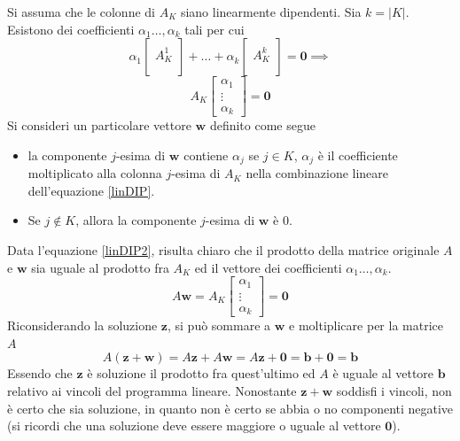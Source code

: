 \documentclass[10pt, letterpaper]{report}
\begin{document}
Si assuma  che le colonne di $A_K$ siano linearmente dipendenti. Sia $k=|K|$. Esistono dei coefficienti $\alpha_1\dots, \alpha_k$ tali per cui 
\begin{equation}\label{linDIP}
    \alpha_1\begin{bmatrix}
        \\A^1_K\\ \\
    \end{bmatrix}+\dots + \alpha_k\begin{bmatrix}
        \\A^k_K\\ \\
    \end{bmatrix}=\mathbf 0\implies 
\end{equation}\begin{equation}\label{linDIP2}
    A_K\begin{bmatrix}
        \alpha_1\\\vdots\\\alpha_k 
    \end{bmatrix}=\mathbf 0
\end{equation}
Si consideri un particolare vettore $\mathbf w$ definito come segue\begin{itemize}
    \item la componente $j$-esima di $\mathbf w$ contiene $\alpha_j$ se $j\in K $, $\alpha_j$ è il coefficiente moltiplicato alla colonna $j$-esima di $A_K$ nella combinazione lineare dell'equazione  \ref{linDIP}.
    \item Se $j\notin K$, allora la componente $j$-esima di $\mathbf w$ è 0.
\end{itemize}
Data l'equazione \ref{linDIP2}, risulta chiaro che il prodotto della matrice originale $A$ e $\mathbf w$ sia uguale al prodotto fra $A_K$ ed il vettore dei coefficienti $\alpha_1\dots,\alpha_k$. 
\begin{equation}\label{linDIP3}
   A\mathbf w= A_K\begin{bmatrix}
        \alpha_1\\\vdots\\\alpha_k 
    \end{bmatrix}=\mathbf 0
\end{equation}
Riconsiderando la soluzione $\mathbf z$, si può sommare a $\mathbf w$ e moltiplicare per la matrice $A$ 
$$ A(\mathbf z+\mathbf w)=A\mathbf z+A\mathbf w=A\mathbf z+\mathbf 0 = \mathbf b+\mathbf 0 = \mathbf b$$
Essendo che $\mathbf z$ è soluzione il prodotto fra quest'ultimo ed $A$ è uguale al vettore $\mathbf b$ relativo ai vincoli del programma lineare. Nonostante $\mathbf z+\mathbf w$ soddisfi i vincoli, non è certo che sia soluzione, in quanto non è certo se abbia o no componenti negative (si ricordi che una soluzione deve essere maggiore o uguale al vettore $\mathbf 0$).
\end{document}
